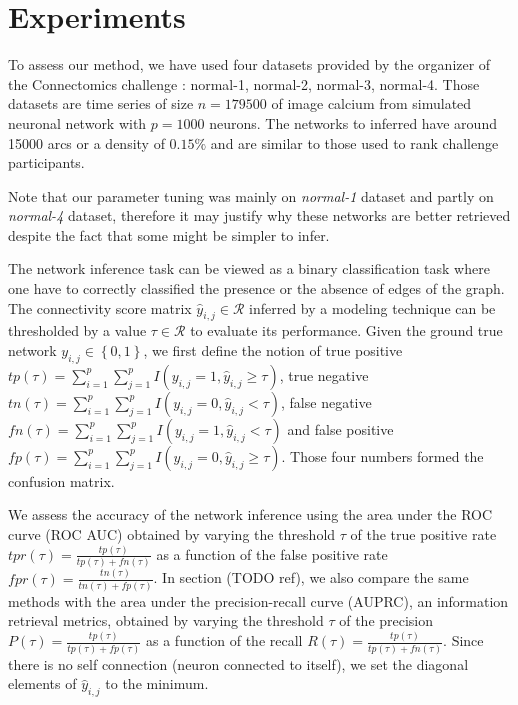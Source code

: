 \documentclass[wcp]{jmlr}
\begin{document}
\section{Experiments}

To assess our method, we have used four datasets provided by the organizer
of the Connectomics challenge : normal-1, normal-2, normal-3, normal-4. Those
datasets are time series of size $n=179500$ of image calcium from simulated
neuronal network \cite{stetter2012model} with $p=1000$ neurons. The networks
to inferred have around 15000 arcs or a density of $0.15\%$ and are similar to those
used to rank challenge participants.

Note that our parameter tuning was mainly on \textit{normal-1} dataset and
partly on \textit{normal-4} dataset, therefore it may justify why these
networks are better retrieved despite the fact that some might be simpler to
infer.

The network inference task can be viewed as a binary classification task
where one have to correctly classified the presence or the absence of edges
of the graph. The connectivity score matrix
$\hat{y}_{i,j} \in \mathcal{R}$ inferred by a modeling technique
can be thresholded by a value $\tau \in \mathcal{R}$ to evaluate its performance.
Given the ground true network $y_{i,j} \in \left\{0, 1\right\}$, we first define the notion of
true positive $tp(\tau) = \sum_{i=1}^p \sum_{j=1}^p I(y_{i,j} = 1, \hat{y}_{i,j} \geq \tau)$,
true negative $tn(\tau) = \sum_{i=1}^p \sum_{j=1}^p I(y_{i,j} = 0, \hat{y}_{i,j} < \tau)$,
false negative $fn(\tau) = \sum_{i=1}^p \sum_{j=1}^p I(y_{i,j} = 1, \hat{y}_{i,j} < \tau)$ and
false positive $fp(\tau) = \sum_{i=1}^p \sum_{j=1}^p I(y_{i,j} = 0, \hat{y}_{i,j} \geq \tau)$.
Those four numbers formed the confusion matrix.

We assess the accuracy of the network inference using the area under
the ROC curve (ROC AUC) obtained by varying the threshold
$\tau$ of the true positive rate $tpr(\tau) = \frac{tp(\tau)}{tp(\tau) + fn(\tau)}$
as a function of the false positive rate
$fpr(\tau) = \frac{tn(\tau)}{tn(\tau) + fp(\tau)}$. In section (TODO ref),
we also compare the same methods with the area under the precision-recall
curve (AUPRC), an information retrieval metrics, obtained by varying the threshold
$\tau$ of the precision $P(\tau) = \frac{tp(\tau)}{tp(\tau) + fp(\tau)}$
as a function of the recall $R(\tau) = \frac{tp(\tau)}{tp(\tau) + fn(\tau)}$.
Since there is no self connection (neuron connected to itself), we set
the diagonal elements of $\hat{y}_{i,j}$ to the minimum.
\end{document}
